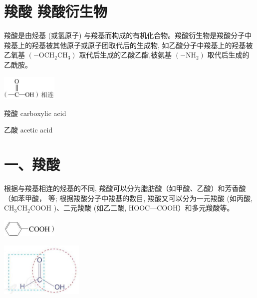 \documentclass[10pt]{article}
\begin{document}
\section*{羧酸 羧酸衍生物}

羧酸是由烃基 (或氢原子) 与羧基而构成的有机化合物。羧酸衍生物是羧酸分子中羧基上的羟基被其他原子或原子团取代后的生成物, 如乙酸分子中羧基上的羟基被乙氧基 \(\left( {-{\mathrm{{OCH}}}_{2}{\mathrm{{CH}}}_{3}}\right)\) 取代后生成的乙酸乙酯,被氨基 \(\left( {-{\mathrm{{NH}}}_{2}}\right)\) 取代后生成的乙酰胺。

\begin{center}
\includegraphics[max width=0.2\textwidth]{images/0190efc5-b58a-7c43-bfb0-e0a030df9cfd_78_554409.jpg}
\end{center}

\begin{mdframed}

羧酸 carboxylic acid

乙酸 acetic acid

\end{mdframed}

\section*{一、羧酸}

根据与羧基相连的烃基的不同, 羧酸可以分为脂肪酸（如甲酸、乙酸）和芳香酸（如苯甲酸， 等; 根据羧酸分子中羧基的数目, 羧酸又可以分为一元羧酸 (如丙酸, \({\mathrm{{CH}}}_{3}{\mathrm{{CH}}}_{2}\mathrm{{COOH}}\) )、二元羧酸 (如乙二酸, HOOC—COOH）和多元羧酸等。

\begin{center}
\includegraphics[max width=0.2\textwidth]{images/0190efc5-b58a-7c43-bfb0-e0a030df9cfd_78_792834.jpg}
\end{center}

\begin{center}
\includegraphics[max width=0.3\textwidth]{images/0190efc5-b58a-7c43-bfb0-e0a030df9cfd_78_420812.jpg}
\end{center}
\end{document}
